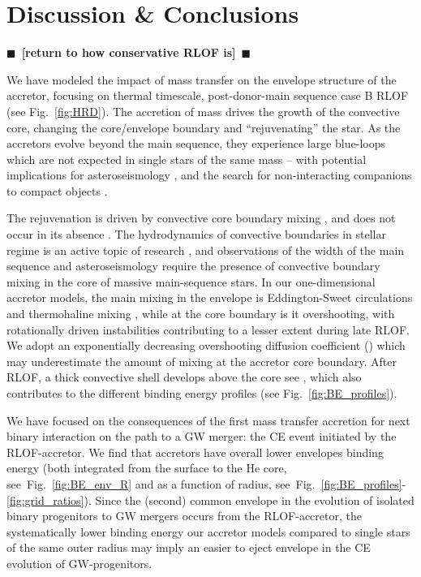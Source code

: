 \documentclass[twocolumn,twocolappendix,trackchanges]{aastex63}
\DeclareRobustCommand{\Figref}[1]{Fig.~\ref{#1}}
\newcommand{\todo}[1]{{\large $\blacksquare$~\textbf{\color{red}[#1]}}~$\blacksquare$}
\begin{document}
\section{Discussion \& Conclusions}
\label{sec:conclusions}

\todo{return to how conservative RLOF is}

We have modeled the impact of mass transfer on the envelope structure
of the accretor, focusing on thermal timescale, post-donor-main
sequence case B RLOF (see \Figref{fig:HRD}). The accretion of mass
drives the growth of the convective core, changing the core/envelope
boundary and ``rejuvenating'' the star. As the accretors evolve
beyond the main sequence, they experience large blue-loops which are
not expected in single stars of the same mass -- with potential
implications for asteroseismology \citep[e.g.,][]{dorn-wallenstein:20},
and the search for non-interacting companions to compact objects
\citep[e.g.,][]{breivik:17, andrews:19, chawla:21}.

The rejuvenation is driven by convective core boundary mixing
\citep[e.g.,][]{hellings:1983, hellings:1984, renzo:2021zoph}, and
does not occur in its absence \citep{braun:95}. The hydrodynamics of
convective boundaries in stellar regime is an active topic of research
\citep[e.g.,][]{anders:22a, anders:22b}, and observations of the width
of the main sequence \citep[e.g.,][]{brott:11} and asteroseismology
\citep[e.g.,][]{moravveji:16} require the presence of convective
boundary mixing in the core of massive main-sequence stars. In our
one-dimensional accretor models, the main mixing in the envelope is
Eddington-Sweet circulations and thermohaline mixing
\citep{renzo:2021zoph}, while at the core boundary is it overshooting,
with rotationally driven instabilities contributing to a lesser extent
during late RLOF. We adopt an exponentially decreasing overshooting
diffusion coefficient (\citealt{claret:17}) which may underestimate
the amount of mixing at the accretor core boundary. After RLOF, a
thick convective shell develops above the core see
\citep[see][]{renzo:2021zoph}, which also contributes to the different
binding energy profiles (see \Figref{fig:BE_profiles}).

We have focused on the consequences of the first mass transfer
accretion for next binary interaction on the path to a GW merger: the
CE event initiated by the RLOF-accretor. We find that accretors have
overall lower envelopes binding energy (both integrated from the
surface to the He core, see~\Figref{fig:BE_env_R} and as a function of
radius, see~\Figref{fig:BE_profiles}-\ref{fig:grid_ratios}). Since the
(second) common envelope in the evolution of isolated binary
progenitors to GW mergers occurs from the RLOF-accretor, the
systematically lower binding energy our accretor models compared to
single stars of the same outer radius may imply an easier to eject
envelope in the CE evolution of GW-progenitors.
\end{document}
